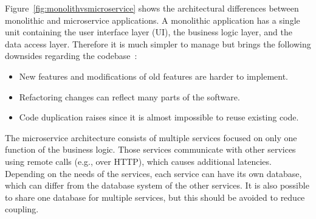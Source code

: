 Figure~\ref{fig:monolithvsmicroservice} shows the architectural differences between monolithic and microservice applications.
A monolithic application has a single unit containing the user interface layer (UI), the business logic layer, and the data access layer.
Therefore it is much simpler to manage but brings the following downsides regarding the codebase~\cite{kalske2017challenges}:
\begin{itemize}
    \item New features and modifications of old features are harder to implement.
    \item Refactoring changes can reflect many parts of the software.
    \item Code duplication raises since it is almost impossible to reuse existing code.
\end{itemize}
The microservice architecture consists of multiple services focused on only one function of the business logic.
Those services communicate with other services using remote calls (e.g., over HTTP), which causes additional latencies.
Depending on the needs of the services, each service can have its own database, which can differ from the database system of the other services.
It is also possible to share one database for multiple services, but this should be avoided to reduce coupling. 

